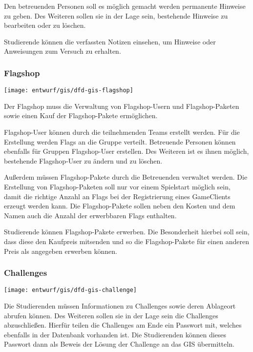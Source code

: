 Den betreuenden Personen soll es möglich gemacht werden permanente Hinweise zu geben. Des Weiteren sollen sie in der Lage sein, bestehende Hinweise zu bearbeiten oder zu löschen.

Studierende können die verfassten Notizen einsehen, um Hinweise oder Anweisungen zum Versuch zu erhalten.

\subsubsection{Flagshop}
\begin{center}
	\texttt{[image: entwurf/gis/dfd-gis-flagshop]}
\end{center}

Der Flagshop muss die Verwaltung von Flagshop-Usern und Flagshop-Paketen sowie einen Kauf der Flagshop-Pakete ermöglichen.

Flagshop-User können durch die teilnehmenden Teams erstellt werden. Für die Erstellung werden Flags an die Gruppe verteilt. Betreuende Personen können ebenfalls für Gruppen Flagshop-User erstellen. Des Weiteren ist es ihnen möglich, bestehende Flagshop-User zu ändern und zu löschen.

Außerdem müssen Flagshop-Pakete durch die Betreuenden verwaltet werden. Die Erstellung von Flagshop-Paketen soll nur vor einem Spielstart möglich sein, damit die richtige Anzahl an Flags bei der Registrierung eines GameClients erzeugt werden kann. Die Flagshop-Pakete sollen neben den Kosten und dem Namen auch die Anzahl der erwerbbaren Flags enthalten.

Studierende können Flagshop-Pakete erwerben. Die Besonderheit hierbei soll sein, dass diese den Kaufpreis mitsenden und so die Flagshop-Pakete für einen anderen Preis als angegeben erwerben können.

\subsubsection{Challenges}
\begin{center}
	\texttt{[image: entwurf/gis/dfd-gis-challenge]}
\end{center}

Die Studierenden müssen Informationen zu Challenges sowie deren Ablageort abrufen können. Des Weiteren sollen sie in der Lage sein die Challenges abzuschließen. Hierfür teilen die Challenges am Ende ein Passwort mit, welches ebenfalls in der Datenbank vorhanden ist. Die Studierenden können dieses Passwort dann als Beweis der Lösung der Challenge an das GIS übermitteln.

